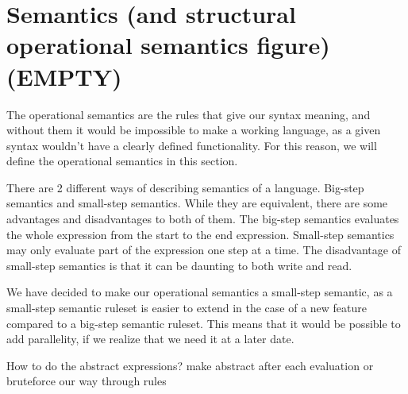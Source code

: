 \section{Semantics (and structural operational semantics figure) (EMPTY)}
The operational semantics are the rules that give our syntax meaning, and without them it would be impossible to make a working language, as a given syntax wouldn't have a clearly defined functionality. For this reason, we will define the operational semantics in this section.

There are 2 different ways of describing semantics of a language. Big-step semantics and small-step semantics. While they are equivalent, there are some advantages and disadvantages to both of them. The big-step semantics evaluates the whole expression from the start to the end expression. Small-step semantics may only evaluate part of the expression one step at a time. The disadvantage of small-step semantics is that it can be daunting to both write and read.

We have decided to make our operational semantics a small-step semantic, as a small-step semantic ruleset is easier to extend in the case of a new feature compared to a big-step semantic ruleset. This means that it would be possible to add parallelity, if we realize that we need it at a later date.


How to do the abstract expressions? make abstract after each evaluation or bruteforce our way through rules

